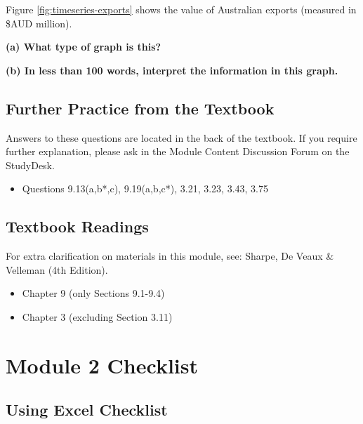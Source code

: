 \documentclass[
  11pt,
  oneside]{scrbook}
\providecommand{\tightlist}{%
  \setlength{\itemsep}{0pt}\setlength{\parskip}{0pt}}
\begin{document}
Figure \ref{fig:timeseries-exports} shows the value of Australian exports (measured in \$AUD million).

\textbf{(a) What type of graph is this?}

\begin{answerbox}\vspace{2cm}\end{answerbox}

\textbf{(b) In less than 100 words, interpret the information in this graph.}

\begin{answerbox}\vspace{4cm}\end{answerbox}

\section{Further Practice from the Textbook}\label{further-practice-from-the-textbook-1}

Answers to these questions are located in the back of the textbook. If you require further explanation, please ask in the Module Content Discussion Forum on the StudyDesk.

\begin{itemize}
\tightlist
\item
  Questions 9.13(a,b*,c), 9.19(a,b,c*), 3.21, 3.23, 3.43, 3.75
\end{itemize}

\section{Textbook Readings}\label{textbook-readings-1}

For extra clarification on materials in this module, see: Sharpe, De Veaux \& Velleman (4th Edition).

\begin{itemize}
\tightlist
\item
  Chapter 9 (only Sections 9.1-9.4)
\item
  Chapter 3 (excluding Section 3.11)
\end{itemize}

\chapter*{Module 2 Checklist}\label{module-2-checklist}

\section*{Using Excel Checklist}\label{using-excel-checklist-1}
\end{document}
